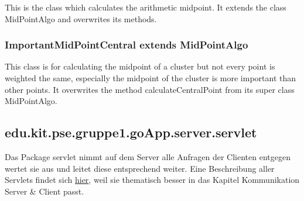 	This is the class which calculates the arithmetic midpoint. It extends the class MidPointAlgo and overwrites its methods.	
	
	
	
	
	
	
	\subsubsection{ImportantMidPointCentral extends MidPointAlgo}
	
	This class is for calculating the midpoint of a cluster but not every point is weighted the same, especially the midpoint of the cluster is more important than other points. It overwrites the method calculateCentralPoint from its super class MidPointAlgo. 	
	
	

	\subsection{edu.kit.pse.gruppe1.goApp.server.servlet}
	Das Package servlet nimmt auf dem Server alle Anfragen der Clienten entgegen wertet sie aus und leitet diese entsprechend weiter. Eine Beschreibung aller Servlets findet sich \hyperlink{Servlets}{hier}, weil sie thematisch besser in das Kapitel Kommunikation Server \& Client passt.
	\newpage
